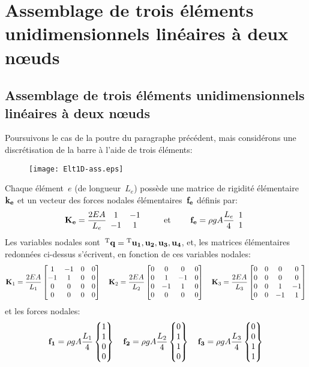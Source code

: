   \section{Assemblage de trois éléments unidimensionnels linéaires à deux nœuds}\label{Sec-ass}
\else
  \subsection{Assemblage de trois éléments unidimensionnels linéaires à deux nœuds}\label{Sec-ass}
\fi
Poursuivons le cas de la poutre du paragraphe précédent, mais considérons une discrétisation
de la barre à l'aide de trois éléments:
\begin{figure}[ht]\centering
\texttt{[image: Elt1D-ass.eps]}
\end{figure}
\medskipvm
Chaque élément~$e$ (de longueur~$L_e$) possède une matrice de rigidité élémentaire~$\MM{k_e}$ 
et un vecteur des forces nodales élémentaires~$\VV{f_e}$ définis par:
\begin{equation}
\MM{K_e} = \frac{2EA}{L_e} \MM{\begin{array}{cc} 1 & -1\\ -1& 1 \end{array}}
\qquad \text{ et } \qquad
\VV{f_e} = \rho g A \frac{L_e}4 \VV{\begin{array}{c} 1 \\1 \end{array}}
\end{equation}
\medskipvm
Les variables nodales sont~${}^\mathrm{T}\mathbf{q}={}^\mathrm{T}\mathbf{u_1, u_2, u_3, u_4}$, et, les matrices élémentaires
redonnées ci-dessus s'écrivent, en fonction de ces variables nodales:
\begin{equation*}
\MM{K}_1 = \frac{2EA}{L_1} \MM*{1 & -1 & 0 & 0\\ -1& 1 & 0 & 0\\ 0&0&0&0\\0&0&0&0}
\quad
\MM{K}_2 = \frac{2EA}{L_2} \MM*{0&0&0&0\\ 0& 1 & -1 & 0\\ 0 & -1& 1& 0\\0&0&0&0}
\quad
\MM{K}_3 = \frac{2EA}{L_3} \MM*{0&0&0&0\\0&0&0&0\\0& 0& 1 & -1\\ 0&0 & -1& 1}
\end{equation*}
et les forces nodales:
\begin{equation*}
\VV{f_1} = \rho g A \frac{L_1}4 \VV*{1 \\1\\0\\0}
\quad
\VV{f_2} = \rho g A \frac{L_2}4 \VV*{0\\1 \\1\\0}
\quad
\VV{f_3} = \rho g A \frac{L_3}4 \VV*{0\\0\\1 \\1}
\end{equation*}
